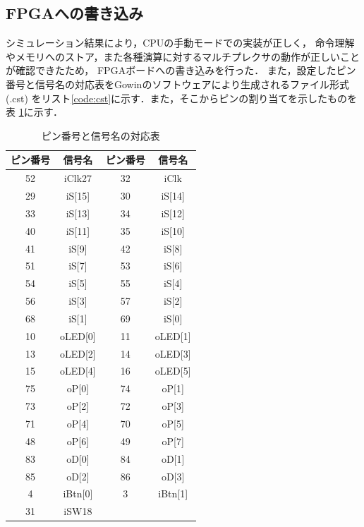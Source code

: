 \documentclass[a4paper,11pt]{ltjsarticle}
\begin{document}
\subsection{FPGAへの書き込み}
シミュレーション結果により，CPUの手動モードでの実装が正しく，
命令理解やメモリへのストア，また各種演算に対するマルチプレクサの動作が正しいことが確認できたため，
FPGAボードへの書き込みを行った．
また，設定したピン番号と信号名の対応表をGowinのソフトウェアにより生成されるファイル形式(.cst)
をリスト\ref{code:cst}に示す．また，そこからピンの割り当てを示したものを表
\ref{tab:pin}に示す．
\begin{table}[H]
    \centering
    \caption{ピン番号と信号名の対応表}
    \label{tab:pin}
    \begin{tabular}{|c|c|c|c|}
        \hline
        ピン番号 & 信号名  &ピン番号 & 信号名  \\
        \hline
        52       & iClk27   &
        32       & iClk     \\
        29       & iS[15]   &
        30       & iS[14]   \\
        33       & iS[13]   &
        34       & iS[12]   \\
        40       & iS[11]   &
        35       & iS[10]   \\
        41       & iS[9]    &
        42       & iS[8]    \\
        51      & iS[7]    &
        53      & iS[6]    \\
        54      & iS[5]    &
        55      & iS[4]    \\
        56      & iS[3]    &
        57      & iS[2]    \\
        68      & iS[1]    &
        69      & iS[0]    \\
        10      & oLED[0]   &
        11      & oLED[1]   \\
        13      & oLED[2]   &
        14      & oLED[3]   \\
        15      & oLED[4]   &
        16      & oLED[5]   \\
        75      & oP[0]     &
        74      & oP[1]     \\
        73      & oP[2]     &
        72      & oP[3]     \\
        71      & oP[4]     &
        70      & oP[5]     \\
        48      & oP[6]     &
        49      & oP[7]     \\
        83      & oD[0]     &
        84      & oD[1]     \\
        85      & oD[2]     &
        86      & oD[3]     \\
        4      & iBtn[0]   &
        3      & iBtn[1]   \\
        31      & iSW18    & & \\
        \hline

    \end{tabular}
\end{table}
\end{document}
